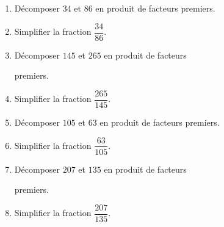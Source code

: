 \begin{exercice*}
    \begin{spacing}{1.5}
        \begin{enumerate}
            \item Décomposer $34$ et $86$ en produit de facteurs premiers.
            \item Simplifier la fraction $\dfrac{34}{86}$.
            \item Décomposer $145$ et $265$ en produit de facteurs
            
            premiers.
            \item Simplifier la fraction $\dfrac{265}{145}$.
            \item Décomposer $105$ et $63$ en produit de facteurs premiers.
            \item Simplifier la fraction $\dfrac{63}{105}$.
            \item Décomposer $207$ et $135$ en produit de facteurs
            
            premiers.
            \item Simplifier la fraction $\dfrac{207}{135}$.
        \end{enumerate}                   
    \end{spacing}
\end{exercice*}
